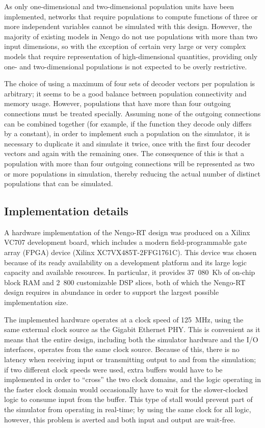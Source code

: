 \documentclass[english]{article}
\newcommand{\design}{Nengo-RT}
\begin{document}
As only one-dimensional and two-dimensional population units have been implemented, networks that require populations to compute functions
of three or more independent variables cannot be simulated with this design.
However, the majority of existing models in Nengo do not use populations with more than two input dimensions, so with the exception of
certain very large or very complex models that require representation of high-dimensional quantities, providing only one- and two-dimensional
populations is not expected to be overly restrictive.

The choice of using a maximum of four sets of decoder vectors per population is arbitrary; it seems to be a good balance between
population connectivity and memory usage. However, populations that have more than four outgoing connections must be treated specially.
Assuming none of the outgoing connections can be combined together (for example, if the function they decode only differs by a constant),
in order to implement such a population on the simulator, it is necessary to duplicate it and simulate it twice,
once with the first four decoder vectors and again with the remaining ones. The consequence of this is that a population with more than
four outgoing connections will be represented as two or more populations in simulation, thereby reducing the actual number of
distinct populations that can be simulated.

\subsection{Implementation details}

A hardware implementation of the \design{} design was produced on a Xilinx VC707 development board, which includes a modern field-programmable gate array (FPGA)
device (Xilinx XC7VX485T-2FFG1761C). This device was chosen because of its ready availability on a development platform and its large logic capacity and available resources.
In particular, it provides 37~080~Kb of on-chip block RAM and 2~800 customizable DSP slices, both of which the Nengo-RT design requires in abundance in order to support
the largest possible implementation size. 


The implemented hardware operates at a clock speed of 125~MHz, using the same extermal clock source as the Gigabit Ethernet PHY.
This is convenient as it means that the entire design, including both the simulator hardware and the I/O interfaces, operates from the same clock source.
Because of this, there is no latency when receiving input or transmitting output to and from the simulation;
if two different clock speeds were used, extra buffers would have to be implemented in order to ``cross'' the two clock domains,
and the logic operating in the faster clock domain would occasionally have to wait for the slower-clocked logic to consume input from the buffer.
This type of stall would prevent part of the simulator from operating in real-time; by using the same clock for all logic, however, this problem is averted and
both input and output are wait-free.
\end{document}
